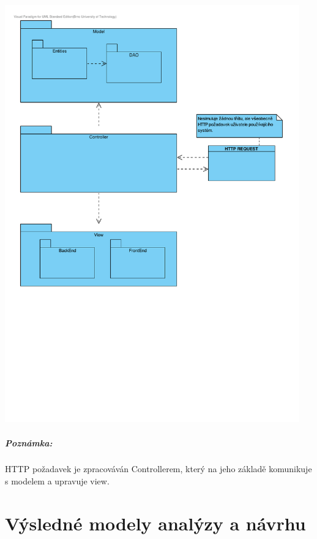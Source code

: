 \documentclass[12pt,a4paper,titlepage,final]{report}
\begin{document}
		\begin{center}
			\captionsetup{type=figure}
			\includegraphics[height=18cm]{img/architektura.pdf}
		\end{center}
		
		\paragraph{Poznámka:}
		HTTP požadavek je zpracováván Controllerem, který na jeho základě komunikuje s modelem a upravuje view.
		


\chapter{Výsledné modely analýzy a návrhu}
\end{document}
